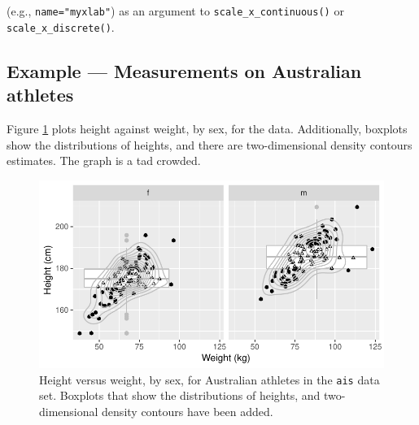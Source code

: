 \begin{fullwidth}
\begin{table}
\begin{center}
\begin{minipage}[t]{0.975\textwidth}
{  (e.g., \texttt{name="myxlab"}) as an argument to
  \texttt{scale\_x\_continuous()} or
  \texttt{scale\_x\_discrete()}.}
\setcounter{footnote}{\value{mpfootnote}}
\end{minipage}
\end{center}
\end{table}
\end{fullwidth}
\enlargethispage{9pt}

\subsection*{Example --- Measurements on Australian athletes}

Figure \ref{fig:ggais} plots height against weight, by sex, for the
 data. Additionally, boxplots show the distributions of
heights, and there are two-dimensional density contours estimates.
The graph is a tad crowded.

\begin{figure}
\begin{Schunk}


\centerline{\includegraphics[width=\textwidth]{figs/07-overlay-dens-frills-1} }

\end{Schunk}
\caption{Height versus weight, by sex, for Australian athletes in the
\texttt{ais} data set. Boxplots that show the distributions of heights,
and two-dimensional density contours have been
added.\label{fig:ggais}}
\end{figure}

